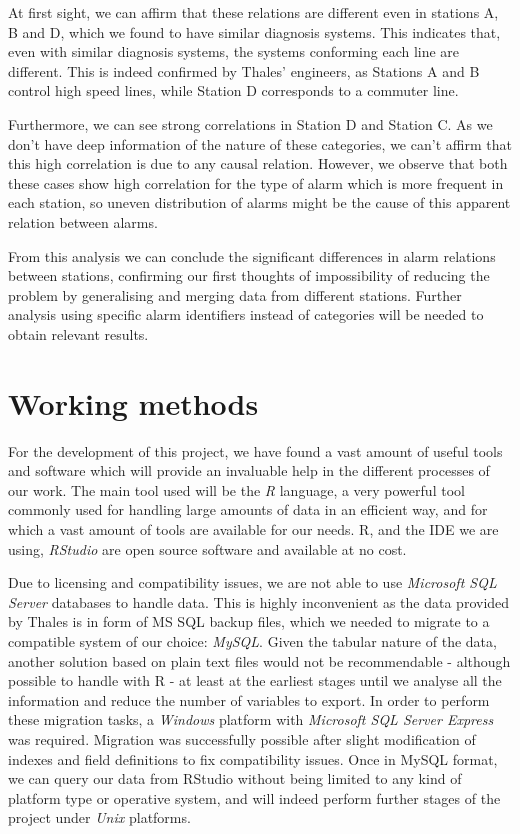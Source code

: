 \clearpage

At first sight, we can affirm that these relations are different even in stations A, B and D, which we found to have similar diagnosis systems. This indicates that, even with similar diagnosis systems, the systems conforming each line are different. This is indeed confirmed by Thales' engineers, as Stations A and B control high speed lines, while Station D corresponds to a commuter line.

Furthermore, we can see strong correlations in Station D and Station C. As we don't have deep information of the nature of these categories, we can't affirm that this high correlation is due to any causal relation. However, we observe that both these cases show high correlation for the type of alarm which is more frequent in each station, so uneven distribution of alarms might be the cause of this apparent relation between alarms.

From this analysis we can conclude the significant differences in alarm relations between stations, confirming our first thoughts of impossibility of reducing the problem by generalising and merging data from different stations. Further analysis using specific alarm identifiers instead of categories will be needed to obtain relevant results.

\clearpage

\section{Working methods}
\label{sec:methods} For the development of this project, we have found a vast amount of useful tools and software which will provide an invaluable help in the different processes of our work. The main tool used will be the \emph{R} language\cite{ihaka1996r}, a very powerful tool commonly used for handling large amounts of data in an efficient way, and for which a vast amount of tools are available for our needs. R, and the IDE we are using, \emph{RStudio}\cite{racine2012rstudio} are open source software and available at no cost.

Due to licensing and compatibility issues, we are not able to use \emph{Microsoft SQL Server} databases to handle data. This is highly inconvenient as the data provided by Thales is in form of MS SQL backup files, which we needed to migrate to a compatible system of our choice: \emph{MySQL}. Given the tabular nature of the data, another solution based on plain text files would not be recommendable - although possible to handle with R - at least at the earliest stages until we analyse all the information and reduce the number of variables to export. In order to perform these migration tasks, a \emph{Windows} platform with \emph{Microsoft SQL Server Express} was required. Migration was successfully possible after slight modification of indexes and field definitions to fix compatibility issues. Once in MySQL format, we can query our data from RStudio without being limited to any kind of platform type or operative system, and will indeed perform further stages of the project under \emph{Unix} platforms.

